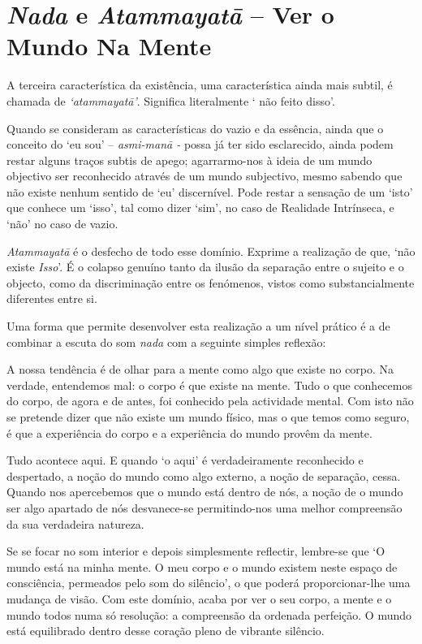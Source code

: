 \chapter{\emph{Nada} e \emph{Atammayatā} -- Ver o Mundo Na Mente}

A terceira característica da existência, uma característica ainda mais
subtil, é chamada de \emph{`atammayatā'}. Significa literalmente ` não
feito disso'.

Quando se consideram as características do vazio e da essência, ainda
que o conceito do `eu sou' -- \emph{asmi-manā -} possa já ter sido
esclarecido, ainda podem restar alguns traços subtis de apego;
agarrarmo-nos à ideia de um mundo objectivo ser reconhecido através de
um mundo subjectivo, mesmo sabendo que não existe nenhum sentido de `eu'
discernível. Pode restar a sensação de um `isto' que conhece um `isso',
tal como dizer `sim', no caso de Realidade Intrínseca, e `não' no caso
de vazio.

\emph{Atammayatā} é o desfecho de todo esse domínio. Exprime a
realização de que, `não existe \emph{Isso}'. É o colapso genuíno tanto
da ilusão da separação entre o sujeito e o objecto, como da
discriminação entre os fenómenos, vistos como substancialmente
diferentes entre si.

Uma forma que permite desenvolver esta realização a um nível prático é a
de combinar a escuta do som \emph{nada} com a seguinte simples reflexão:

A nossa tendência é de olhar para a mente como algo que existe no corpo.
Na verdade, entendemos mal: o corpo é que existe na mente. Tudo o que
conhecemos do corpo, de agora e de antes, foi conhecido pela actividade
mental. Com isto não se pretende dizer que não existe um mundo físico,
mas o que temos como seguro, é que a experiência do corpo e a
experiência do mundo provêm da mente.

Tudo acontece aqui. E quando `o aqui' é verdadeiramente reconhecido e
despertado, a noção do mundo como algo externo, a noção de separação,
cessa. Quando nos apercebemos que o mundo está dentro de nós, a noção de
o mundo ser algo apartado de nós desvanece-se permitindo-nos uma melhor
compreensão da sua verdadeira natureza.

Se se focar no som interior e depois simplesmente reflectir, lembre-se
que `O mundo está na minha mente. O meu corpo e o mundo existem neste
espaço de consciência, permeados pelo som do silêncio', o que poderá
proporcionar-lhe uma mudança de visão. Com este domínio, acaba por ver o
seu corpo, a mente e o mundo todos numa só resolução: a compreensão da
ordenada perfeição. O mundo está equilibrado dentro desse coração pleno
de vibrante silêncio.


